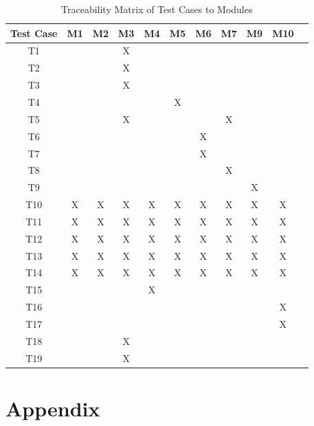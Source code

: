 \documentclass[12pt, titlepage]{article}
\begin{document}

\begin{table}[h]
\centering
\begin{tabular}{|c|c|c|c|c|c|c|c|c|c|c|}
\hline
\textbf{Test Case} & \textbf{M1} & \textbf{M2} & \textbf{M3} & \textbf{M4} & \textbf{M5} & \textbf{M6} & \textbf{M7} & \textbf{M9} & \textbf{M10} \\ \hline
T1 &  &  & X &  &  &  &  &  &  \\ \hline
T2 &  &  & X &  &  &  &  &  &  \\ \hline
T3 &  &  & X &  &  &  &  &  &  \\ \hline
T4 &  &  &   &  & X &  &  &  &  \\ \hline
T5 &  &  & X &  &   &  & X &  &  \\ \hline
T6 &  &  &  &  &  & X &  &  &  \\ \hline
T7 &  &  &  &  &  & X &  &  &  \\ \hline
T8 &  &  &  &  &  &  & X &  &  \\ \hline
T9 &  &  &  &  &  &  &  & X &  \\ \hline
T10 & X & X & X & X & X & X & X & X & X \\ \hline
T11 & X & X & X & X & X & X & X & X & X \\ \hline
T12 & X & X & X & X & X & X & X & X & X \\ \hline
T13 & X & X & X & X & X & X & X & X & X \\ \hline
T14 & X & X & X & X & X & X & X & X & X \\ \hline
T15 &  &  &  & X &  &  &  &  &  \\ \hline
T16 &  &  &  &  &  &  &  &  & X \\ \hline
T17 &  &  &  &  &  &  &  &  & X \\ \hline
T18 &  &  & X &  &  &  &  &  &  \\ \hline
T19 &  &  & X &  &  &  &  &  &  \\ \hline
\end{tabular}
\caption{Traceability Matrix of Test Cases to Modules}
\label{tab:traceability-matrix}
\end{table}





\newpage

\section{Appendix}
\end{document}
